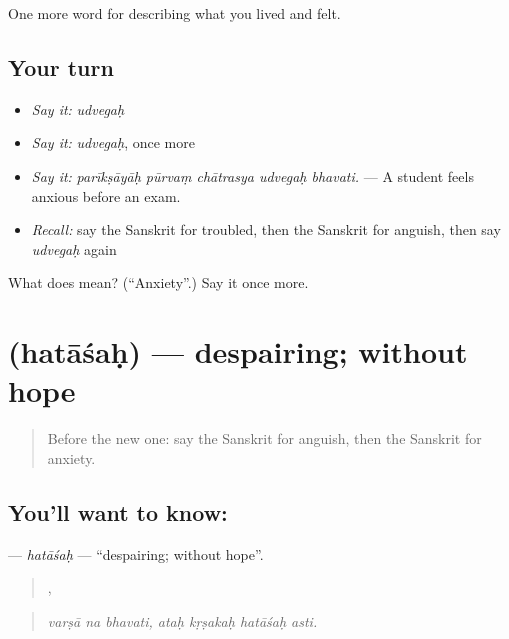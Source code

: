 \begin{grammarlens}[title={What you've built}]
One more word for describing what you lived and felt.
\end{grammarlens}

\subsection*{Your turn}
\begin{itemize}
\raggedright
  \item \emph{Say it:} \emph{udvegaḥ}
  \item \emph{Say it:} \emph{udvegaḥ}, once more
  \item \emph{Say it:} \emph{parīkṣāyāḥ pūrvaṃ chātrasya udvegaḥ bhavati.} — A student feels anxious before an exam.
  \item \emph{Recall:} say the Sanskrit for troubled, then the Sanskrit for anguish, then say \emph{udvegaḥ} again
\end{itemize}

\begin{tcolorbox}[breakable,colback=teal!4,colframe=teal!35!black,title={Before you move on}]
What does  mean? (\textquotedblleft{}Anxiety\textquotedblright{}.) Say it once more.
\end{tcolorbox}
\section[\texorpdfstring{\sk{हताशः} (hatāśaḥ)}{हताशः (hatāśaḥ)}]{ (hatāśaḥ) — despairing; without hope}

\label{lesson:SA-C452-hatasah}



\begin{quote}
Before the new one: say the Sanskrit for anguish, then the Sanskrit for anxiety.
\end{quote}

\subsection*{You'll want to know: }
\textbf{} — \emph{hatāśaḥ} — \textquotedblleft{}despairing; without hope\textquotedblright{}.

\begin{quote}
  ,    
\end{quote}

\begin{quote}
\emph{varṣā na bhavati, ataḥ kṛṣakaḥ hatāśaḥ asti.}
\end{quote}

